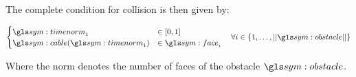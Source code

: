 	The complete condition for collision is then given by:

	\begin{equation}
		\begin{cases}
			\timenorm_1 &\in [0, 1]\\
			\cable(\timenorm_1) &\in \face_i
		\end{cases}
		\quad \forall i \in \{1, \ldots, \norm{\obstacle}\}
		\label{eq:cable_obstacle_collision_condition}
	\end{equation}

	Where the norm denotes the number of faces of the obstacle $\obstacle$.
